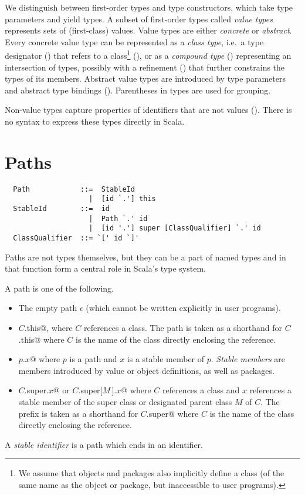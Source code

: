 We distinguish between first-order types and type constructors, which
take type parameters and yield types. A subset of first-order types
called {\em value types} represents sets of (first-class) values.
Value types are either {\em concrete} or {\em abstract}. Every
concrete value type can be represented as a {\em class type}, i.e.\ a
type designator () that refers to a
class\footnote{We assume that objects and packages also implicitly
define a class (of the same name as the object or package, but
inaccessible to user programs).} (), or as a {\em
compound type} () representing an
intersection of types, possibly with a refinement
() that further constrains the types of its
members.
Abstract value types are introduced by type parameters and abstract
type bindings ().  Parentheses in types are used for
grouping.

Non-value types capture properties of
identifiers that are not values
().  There is no syntax to express these
types directly in Scala.

\section{Paths}\label{sec:paths}\label{sec:stable-ids}

\syntax\begin{lstlisting}
  Path            ::=  StableId
                    |  [id `.'] this
  StableId        ::=  id
                    |  Path `.' id 
                    |  [id '.'] super [ClassQualifier] `.' id
  ClassQualifier  ::= `[' id `]'
\end{lstlisting}

Paths are not types themselves, but they can be a part of named types
and in that function form a central role in Scala's type system.

A path is one of the following.
\begin{itemize}
\item
The empty path $\epsilon$ (which cannot be written explicitly in user programs).
\item
\lstinline@$C$.this@, where $C$ references a class. 
The path  is taken as a shorthand for \lstinline@$C$.this@ where 
$C$ is the name of the class directly enclosing the reference. 
\item
\lstinline@$p$.$x$@ where $p$ is a path and $x$ is a stable member of $p$.
{\em Stable members} are members introduced by value or object
definitions, as well as packages.
\item
\lstinline@$C$.super.$x$@ or \lstinline@$C$.super[$M\,$].$x$@
where $C$ references a class and $x$ references a 
stable member of the super class or designated parent class $M$ of $C$. 
The prefix  is taken as a shorthand for \lstinline@$C$.super@ where 
$C$ is the name of the class directly enclosing the reference. 
\end{itemize}
A {\em stable identifier} is a path which ends in an identifier.

